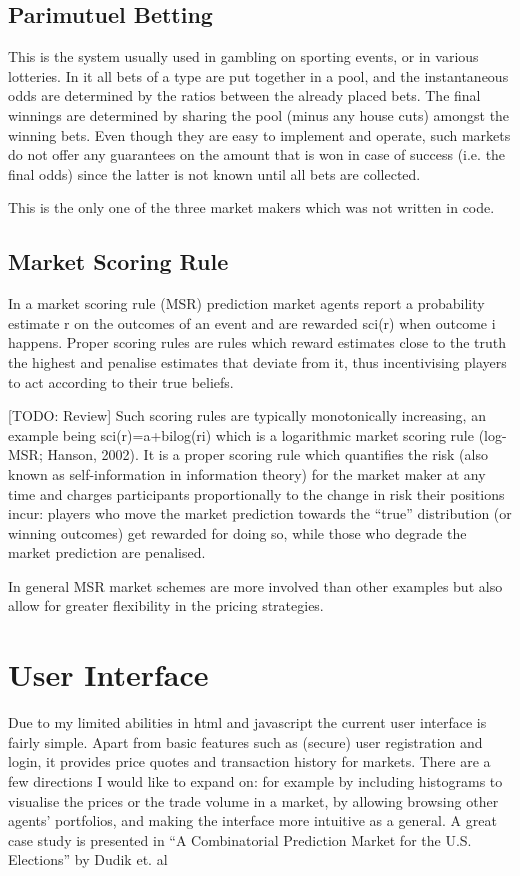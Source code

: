 \documentclass[bsc,frontabs,twoside,singlespacing,parskip,deptreport]{infthesis}     %
\begin{document}
\subsection{Parimutuel Betting}
This is the system usually used in gambling on sporting events, or in various lotteries. In it all bets of a type are put together in a pool, and the instantaneous odds are determined by the ratios between the already placed bets. The final winnings are determined by sharing the pool (minus any house cuts) amongst the winning bets. Even though they are easy to implement and operate, such markets do not offer any guarantees on the amount that is won in case of success (i.e. the final odds) since the latter is not known until all bets are collected.

This is the only one of the three market makers which was not written in code. 

\subsection{Market Scoring Rule}
In a market scoring rule (MSR) prediction market agents report a probability estimate r on the outcomes of an event and are rewarded sci(r) when outcome i happens. Proper scoring rules are rules which reward estimates close to the truth the highest and penalise estimates that deviate from it, thus incentivising players to act according to their true beliefs.

 [TODO: Review] Such scoring rules are typically monotonically increasing, an example being sci(r)=a+bilog(ri) which is a logarithmic market scoring rule (log-MSR; Hanson, 2002). It is a proper scoring rule which quantifies the risk (also known as self-information in information theory) for the market maker at any time and charges participants proportionally to the change in risk their positions incur: players who move the market prediction towards the “true” distribution (or winning outcomes) get rewarded for doing so, while those who degrade the market prediction are penalised.

In general MSR market schemes are more involved than other examples but also allow for greater flexibility in the pricing strategies.

\section{User Interface}

    Due to my limited abilities in html and javascript the current user interface is fairly simple. Apart from basic features such as (secure) user registration and login, it provides price quotes and transaction history for markets. There are a few directions I would like to expand on: for example by including histograms to visualise the prices or the trade volume in a market, by allowing browsing other agents’ portfolios, and making the interface more intuitive as a general. A great case study is presented in “A Combinatorial Prediction Market for the U.S. Elections” by Dudik et. al
\end{document}
